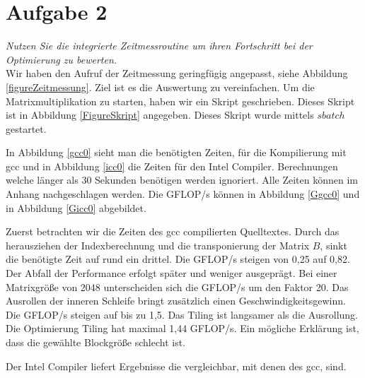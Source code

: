\chapter{Aufgabe 2}
\textit{Nutzen Sie die integrierte Zeitmessroutine um ihren Fortschritt bei der Optimierung zu bewerten.}\\

Wir haben den Aufruf der Zeitmessung geringfügig angepasst, siehe Abbildung \ref{figureZeitmessung}. Ziel ist es die Auswertung zu vereinfachen. Um die Matrixmultiplikation zu starten, haben wir ein Skript geschrieben. Dieses Skript ist in Abbildung \ref{FigureSkript} angegeben. Dieses Skript wurde mittels $sbatch$ gestartet. 

In Abbildung \ref{gcc0} sieht man die benötigten Zeiten, für die Kompilierung mit gcc und in Abbildung \ref{icc0} die Zeiten für den Intel Compiler. Berechnungen welche länger als 30 Sekunden benötigen werden ignoriert. Alle Zeiten können im Anhang nachgeschlagen werden. Die GFLOP/s können in Abbildung \ref{Ggcc0} und in Abbildung \ref{Gicc0} abgebildet.

Zuerst betrachten wir die Zeiten des gcc compilierten Quelltextes. Durch das herausziehen der Indexberechnung und die transponierung der Matrix $B$, sinkt die benötigte Zeit auf rund ein drittel. Die GFLOP/s steigen von 0,25 auf 0,82. Der Abfall der Performance erfolgt später und weniger ausgeprägt. Bei einer Matrixgröße von 2048 unterscheiden sich die GFLOP/s um den Faktor 20. Das Ausrollen der inneren Schleife bringt zusätzlich einen Geschwindigkeitsgewinn. Die GFLOP/s steigen auf bis zu 1,5. Das Tiling ist langsamer als die Ausrollung. Die Optimierung Tiling hat maximal 1,44 GFLOP/s. Ein mögliche Erklärung ist, dass die gewählte Blockgröße schlecht ist.

Der Intel Compiler liefert Ergebnisse die vergleichbar, mit denen des gcc, sind. 

